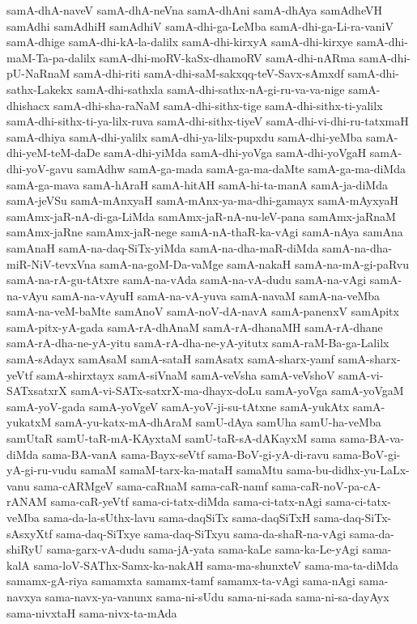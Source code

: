 {samA-dhA-naveV
samA-dhA-neVna
samA-dhAni
samA-dhAya
samAdheVH
samAdhi
samAdhiH
samAdhiV
samA-dhi-ga-LeMba
samA-dhi-ga-Li-ra-vaniV
samA-dhige
samA-dhi-kA-la-dalilx
samA-dhi-kirxyA
samA-dhi-kirxye
samA-dhi-maM-Ta-pa-dalilx
samA-dhi-moRV-kaSx-dhamoRV
samA-dhi-nARma
samA-dhi-pU-NaRnaM
samA-dhi-riti
samA-dhi-saM-sakxqq-teV-Savx-sAmxdf
samA-dhi-sathx-Lakekx
samA-dhi-sathxla
samA-dhi-sathx-nA-gi-ru-va-va-nige
samA-dhishacx
samA-dhi-sha-raNaM
samA-dhi-sithx-tige
samA-dhi-sithx-ti-yalilx
samA-dhi-sithx-ti-ya-lilx-ruva
samA-dhi-sithx-tiyeV
samA-dhi-vi-dhi-ru-tatxmaH
samA-dhiya
samA-dhi-yalilx
samA-dhi-ya-lilx-pupxdu
samA-dhi-yeMba
samA-dhi-yeM-teM-daDe
samA-dhi-yiMda
samA-dhi-yoVga
samA-dhi-yoVgaH
samA-dhi-yoV-gavu
samAdhw
samA-ga-mada
samA-ga-ma-daMte
samA-ga-ma-diMda
samA-ga-mava
samA-hAraH
samA-hitAH
samA-hi-ta-manA
samA-ja-diMda
samA-jeVSu
samA-mAnxyaH
samA-mAnx-ya-ma-dhi-gamayx
samA-mAyxyaH
samAmx-jaR-nA-di-ga-LiMda
samAmx-jaR-nA-nu-leV-pana
samAmx-jaRnaM
samAmx-jaRne
samAmx-jaR-nege
samA-nA-thaR-ka-vAgi
samA-nAya
samAna
samAnaH
samA-na-daq-SiTx-yiMda
samA-na-dha-maR-diMda
samA-na-dha-miR-NiV-tevxVna
samA-na-goM-Da-vaMge
samA-nakaH
samA-na-mA-gi-paRvu
samA-na-rA-gu-tAtxre
samA-na-vAda
samA-na-vA-dudu
samA-na-vAgi
samA-na-vAyu
samA-na-vAyuH
samA-na-vA-yuva
samA-navaM
samA-na-veMba
samA-na-veM-baMte
samAnoV
samA-noV-dA-navA
samA-panenxV
samApitx
samA-pitx-yA-gada
samA-rA-dhAnaM
samA-rA-dhanaMH
samA-rA-dhane
samA-rA-dha-ne-yA-yitu
samA-rA-dha-ne-yA-yitutx
samA-raM-Ba-ga-Lalilx
samA-sAdayx
samAsaM
samA-sataH
samAsatx
samA-sharx-yamf
samA-sharx-yeVtf
samA-shirxtayx
samA-siVnaM
samA-veVsha
samA-veVshoV
samA-vi-SATxsatxrX
samA-vi-SATx-satxrX-ma-dhayx-doLu
samA-yoVga
samA-yoVgaM
samA-yoV-gada
samA-yoVgeV
samA-yoV-ji-su-tAtxne
samA-yukAtx
samA-yukatxM
samA-yu-katx-mA-dhAraM
samU-dAya
samUha
samU-ha-veMba
samUtaR
samU-taR-mA-KAyxtaM
samU-taR-sA-dAKayxM
sama
sama-BA-va-diMda
sama-BA-vanA
sama-Bayx-seVtf
sama-BoV-gi-yA-di-ravu
sama-BoV-gi-yA-gi-ru-vudu
samaM
samaM-tarx-ka-mataH
samaMtu
sama-bu-didhx-yu-LaLx-vanu
sama-cARMgeV
sama-caRnaM
sama-caR-namf
sama-caR-noV-pa-cA-rANAM
sama-caR-yeVtf
sama-ci-tatx-diMda
sama-ci-tatx-nAgi
sama-ci-tatx-veMba
sama-da-la-sUthx-lavu
sama-daqSiTx
sama-daqSiTxH
sama-daq-SiTx-sAsxyXtf
sama-daq-SiTxye
sama-daq-SiTxyu
sama-da-shaR-na-vAgi
sama-da-shiRyU
sama-garx-vA-dudu
sama-jA-yata
sama-kaLe
sama-ka-Le-yAgi
sama-kalA
sama-loV-SAThx-Samx-ka-nakAH
sama-ma-shunxteV
sama-ma-ta-diMda
samamx-gA-riya
samamxta
samamx-tamf
samamx-ta-vAgi
sama-nAgi
sama-navxya
sama-navx-ya-vanunx
sama-ni-sUdu
sama-ni-sada
sama-ni-sa-dayAyx
sama-nivxtaH
sama-nivx-ta-mAda
}
